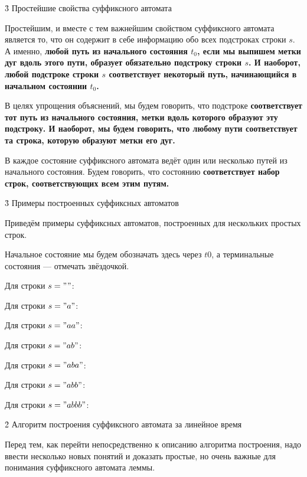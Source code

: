 \h3{ Простейшие свойства суффиксного автомата }

Простейшим, и вместе с тем важнейшим свойством суффиксного автомата является то, что он содержит в себе информацию обо всех подстроках строки $s$. А именно, \bf{любой путь} из начального состояния $t_0$, если мы выпишем метки дуг вдоль этого пути, образует обязательно \bf{подстроку} строки $s$. И наоборот, любой подстроке строки $s$ соответствует некоторый путь, начинающийся в начальном состоянии $t_0$.

В целях упрощения объяснений, мы будем говорить, что подстроке \bf{соответствует} тот путь из начального состояния, метки вдоль которого образуют эту подстроку. И наоборот, мы будем говорить, что любому пути \bf{соответствует} та строка, которую образуют метки его дуг.

В каждое состояние суффиксного автомата ведёт один или несколько путей из начального состояния. Будем говорить, что состоянию \bf{соответствует} набор строк, соответствующих всем этим путям.


\h3{ Примеры построенных суффиксных автоматов }

Приведём примеры суффиксных автоматов, построенных для нескольких простых строк.

Начальное состояние мы будем обозначать здесь через $t0$, а терминальные состояния --- отмечать звёздочкой.

Для строки $s = ""$:


Для строки $s = "a"$:


Для строки $s = "aa"$:


Для строки $s = "ab"$:


Для строки $s = "aba"$:


Для строки $s = "abb"$:


Для строки $s = "abbb"$:




\h2{ Алгоритм построения суффиксного автомата за линейное время }

Перед тем, как перейти непосредственно к описанию алгоритма построения, надо ввести несколько новых понятий и доказать простые, но очень важные для понимания суффиксного автомата леммы.


